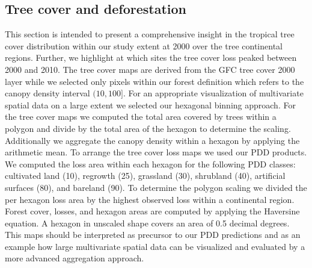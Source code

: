 		\subsection{Tree cover and deforestation}
		\label{subsec:results_tree_cover_and_deforestation}
			This section is intended to present a comprehensive insight in the tropical tree cover distribution within our study extent at 2000 over the tree continental regions. Further, we highlight at which sites the tree cover loss peaked between 2000 and 2010. The tree cover maps are derived from the \ac{GFC} tree cover 2000 layer while we selected only pixels within our forest definition which refers to the canopy density interval $(10,100]$. For an appropriate visualization of multivariate spatial data on a large extent we selected our hexagonal binning approach. For the tree cover maps we computed the total area covered by trees within a polygon and divide by the total area of the hexagon to determine the scaling. Additionally we aggregate the canopy density within a hexagon by applying the arithmetic mean. To arrange the tree cover loss maps we used our \ac{PDD} products. We computed the loss area within each hexagon for the following \ac{PDD} classes: cultivated land (10), regrowth (25), grassland (30), shrubland (40), artificial surfaces (80), and bareland (90). To determine the polygon scaling we divided the per hexagon loss area by the highest observed loss within a continental region. Forest cover, losses, and hexagon areas are computed by applying the Haversine equation. A hexagon in unscaled shape covers an area of 0.5 decimal degrees. This maps should be interpreted as precursor to our \ac{PDD} predictions and as an example how large multivariate spatial data can be visualized and evaluated by a more advanced aggregation approach.

